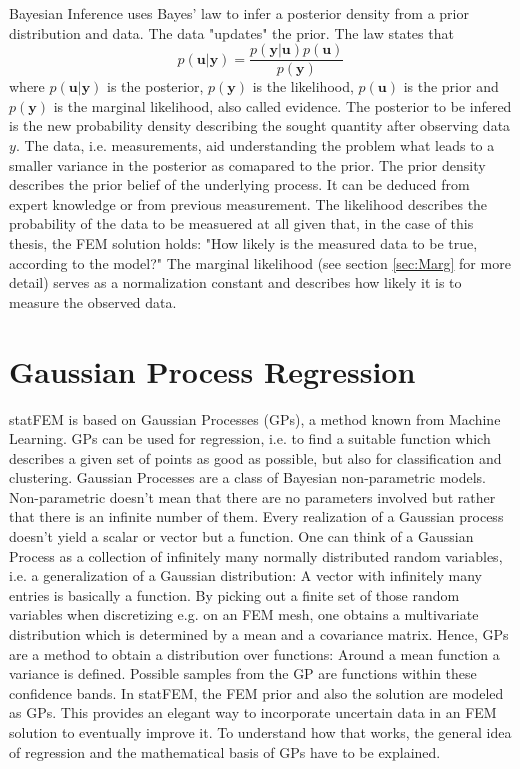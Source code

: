 \documentclass[%
  a4paper,oneside,%
  11pt,%
  smallchapters,
  style=printdev,
  extramargin,
  green,%
  rgb, <cmyk>
  ]{tubsbook}
\begin{document}
Bayesian Inference uses Bayes' law to infer a posterior density from a prior distribution and data. The data "updates" the prior. The law states that
\begin{equation}
p(\bm{u}|\bm{y}) = \frac{p(\bm{y}|\bm{u})p(\bm{u})}{p(\bm{y})}
\end{equation}
where $p(\bm{u}|\bm{y})$ is the posterior, $p(\bm{y})$ is the likelihood, $p(\bm{u})$ is the prior and $p(\bm{y})$ is the marginal likelihood, also called evidence. The posterior to be infered is the new probability density describing the sought quantity after observing data $y$. The data, i.e. measurements, aid understanding the problem what leads to a smaller variance in the posterior as comapared to the prior. The prior density describes the prior belief of the underlying process. It can be deduced from expert knowledge or from previous measurement. 
The likelihood describes the probability of the data to be measuered at all given that, in the case of this thesis, the FEM solution holds: "How likely is the measured data to be true, according to the model?"
The marginal likelihood (see section \ref{sec:Marg} for more detail) serves as a normalization constant and describes how likely it is to measure the observed data.


\section{Gaussian Process Regression}
statFEM is based on Gaussian Processes (GPs), a method known from Machine Learning. \cite{murphy2012} GPs can be used for regression, i.e. to find a suitable function which describes a given set of points as good as possible, but also for classification and clustering. \cite{gortler2019} 
Gaussian Processes are a class of Bayesian non-parametric models. Non-parametric doesn't mean that there are no parameters involved but rather that there is an infinite number of them. \cite{gortler2019} Every realization of a Gaussian process doesn't yield a scalar or vector but a function. One can think of a Gaussian Process as a collection of infinitely many normally distributed random variables, i.e. a generalization of a Gaussian distribution: A vector with infinitely many entries is basically a function. By picking out a finite set of those random variables when discretizing e.g. on an FEM mesh, one obtains a multivariate distribution which is determined by a mean and a covariance matrix. \cite[p. 2]{rasmussen2006} Hence, GPs are a method to obtain a distribution over functions: Around a mean function a variance is defined. Possible samples from the GP are functions within these confidence bands. In statFEM, the FEM prior and also the solution are modeled as GPs. This provides an elegant way to incorporate uncertain data in an FEM solution to eventually improve it. To understand how that works, the general idea of regression and the mathematical basis of GPs have to be explained.
\end{document}
